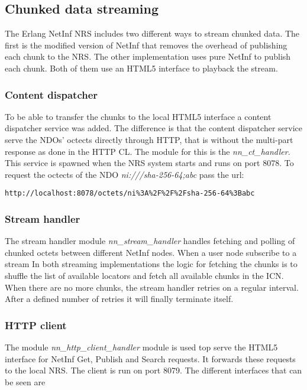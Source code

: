 \subsection{Chunked data streaming}

The Erlang NetInf NRS includes two different ways to stream chunked data. The first is the modified version of NetInf that removes the overhead of publishing each chunk to the NRS. The other implementation uses pure NetInf to publish each chunk. Both of them use an HTML5 interface to playback the stream. 


\subsubsection{Content dispatcher}

To be able to transfer the chunks to the local HTML5 interface a content dispatcher service was added. The difference is that the content dispatcher service serve the NDOs' octects directly through HTTP, that is without the multi-part response as done in the HTTP CL. The module for this is the \textit{nn\_ct\_handler}. This service is spawned when the NRS system starts and runs on port 8078. To request the octects of the NDO \textit{ni:///sha-256-64;abc} pass the url:
\begin{verbatim}
http://localhost:8078/octets/ni%3A%2F%2F%2Fsha-256-64%3Babc 
\end{verbatim}

\subsubsection{Stream handler}
The stream handler module \textit{nn\_stream\_handler} handles fetching and polling of chunked octets between different NetInf nodes. When a user node subscribe to a stream 
In both streaming implementations the logic for fetching the chunks is to shuffle the list of available locators and fetch all available chunks in the ICN. When there are no more chunks, the stream handler retries on a regular interval. After a defined number of retries it will finally terminate itself.  

\subsubsection{HTTP client}
The module \textit{nn\_http\_client\_handler} module is used top serve the HTML5 interface for NetInf Get, Publish and Search requests. It forwards these requests to the local NRS. The client is run on port 8079. The different interfaces that can be seen are


